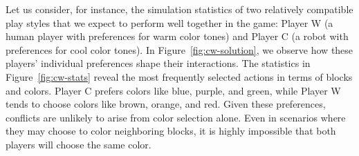         \noindent
        Let us consider, for instance, the simulation statistics of two relatively compatible play styles that we expect to perform well together in the game: Player W (a human player with preferences for warm color tones) and Player C (a robot with preferences for cool color tones). In Figure~\ref{fig:cw-solution}, we observe how these players' individual preferences shape their interactions. The statistics in Figure~\ref{fig:cw-stats} reveal the most frequently selected actions in terms of blocks and colors. Player C prefers colors like blue, purple, and green, while Player W tends to choose colors like brown, orange, and red. Given these preferences, conflicts are unlikely to arise from color selection alone. Even in scenarios where they may choose to color neighboring blocks, it is highly impossible that both players will choose the same color.
